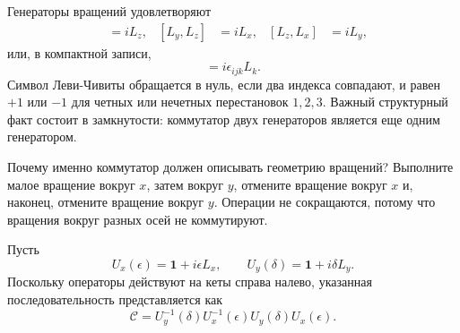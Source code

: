 Генераторы вращений удовлетворяют
\begin{align}
[L_x,L_y]&=iL_z,&
[L_y,L_z]&=iL_x,&
[L_z,L_x]&=iL_y,
\end{align}
или, в компактной записи,
\begin{equation}
[L_i,L_j]=i\epsilon_{ijk}L_k.
\end{equation}
Символ Леви-Чивиты обращается в нуль, если два индекса совпадают, и равен \(+1\) или \(-1\) для четных или нечетных перестановок \(1,2,3\). Важный структурный факт состоит в замкнутости: коммутатор двух генераторов является еще одним генератором.

Почему именно коммутатор должен описывать геометрию вращений? Выполните малое вращение вокруг \(x\), затем вокруг \(y\), отмените вращение вокруг \(x\) и, наконец, отмените вращение вокруг \(y\). Операции не сокращаются, потому что вращения вокруг разных осей не коммутируют.

\begin{classroomqa}
\end{classroomqa}

Пусть
\begin{equation}
U_x(\epsilon)=\mathbf 1+i\epsilon L_x,
\qquad
U_y(\delta)=\mathbf 1+i\delta L_y.
\end{equation}
Поскольку операторы действуют на кеты справа налево, указанная последовательность представляется как
\begin{equation}
\mathcal C
=U_y^{-1}(\delta)U_x^{-1}(\epsilon)
 U_y(\delta)U_x(\epsilon).
\end{equation}

\begin{classroomqa}
\end{classroomqa}

